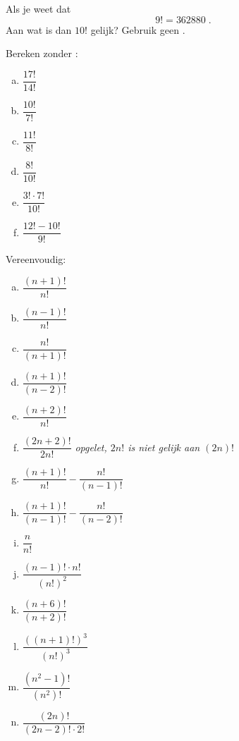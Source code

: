 \documentclass[12pt,twoside]{article}
\begin{document}
\begin{oefening}
Als je weet dat
$$9!=362880\;.$$
Aan wat is dan $10!$ gelijk? Gebruik geen .
\end{oefening}

\begin{oefening}
Bereken zonder :
\begin{multicols}{3}
\begin{enumerate}[(a)]
  \itemsep.7em
  \item $\dfrac{17!}{14!}$
  \item $\dfrac{10!}{7!}$
  \item $\dfrac{11!}{8!}$
  \item $\dfrac{8!}{10!}$
  \item $\dfrac{3!\cdot 7!}{10!}$
  \item $\dfrac{12!-10!}{9!}$
\end{enumerate}
\end{multicols}
\end{oefening}

\begin{oefening}
Vereenvoudig:
\begin{multicols}{2}
\begin{enumerate}[(a)]
  \itemsep.7em
  \item $\dfrac{(n+1)!}{n!}$
  \item $\dfrac{(n-1)!}{n!}$
  \item $\dfrac{n!}{(n+1)!}$
  \item $\dfrac{(n+1)!}{(n-2)!}$
  \item $\dfrac{(n+2)!}{n!}$
  \item $\dfrac{(2n+2)!}{2n!}$ \hfill {\em\scriptsize opgelet, $2n!$ is niet gelijk aan $(2n)!$}
  \item $\dfrac{(n+1)!}{n!}-\dfrac{n!}{(n-1)!}$
  \item $\dfrac{(n+1)!}{(n-1)!}-\dfrac{n!}{(n-2)!}$
  \item $\dfrac{n}{n!}$  
  \item $\dfrac{(n-1)!\cdot n!}{(n!)^2}$  
  \item $\dfrac{(n+6)!}{(n+2)!}$  
  \item $\dfrac{\left(\left(n+1\right)!\right)^3}{(n!)^3}$  
  \item $\dfrac{(n^2-1)!}{(n^2)!}$  
  \item $\dfrac{(2n)!}{(2n-2)!\cdot 2!}$  
\end{enumerate}
\end{multicols}
\end{oefening}
\end{document}
